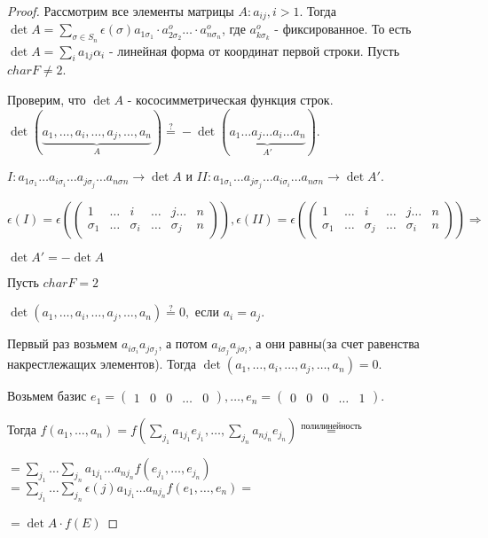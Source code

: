 \begin{proof}
	Рассмотрим все элементы матрицы \(A: a_{ij}, i>1\). Тогда \(\det A = \sum_{\sigma\in S_n} \epsilon(\sigma)a_{1\sigma_1}\cdot a^o_{2\sigma_2}\ldots \cdot a^o_{n\sigma_n}\), где \(a^o_{k\sigma_k}\) - фиксированное. То есть \(\det A = \sum_{i}a_{1j}\alpha_i\) - линейная форма от координат первой строки. \newline
	Пусть \(char F\ne 2\). 
	
	Проверим, что $\det A$ - кососимметрическая функция строк. \newline \(\det(\underbrace{a_1, \ldots, a_i, \ldots, a_j, \ldots, a_n}_A) \overset{?}{=} -\det(\underbrace{a_1 \ldots a_j \ldots a_i \ldots a_n}_{A'}).\) 
	
	\(I:a_{1\sigma_1}\ldots a_{i\sigma_i}\ldots a_{j\sigma_j}\ldots a_{n\sigma n}\to \det A\) и \(II:a_{1\sigma_1}\ldots a_{j\sigma_j}\ldots a_{i\sigma_i}\ldots a_{n\sigma n}\to \det A'.\)
	
	\(\epsilon(I) = \epsilon(\begin{pmatrix}
		1 & \ldots & i & \ldots & j \ldots & n \\
		\sigma_1 & \ldots & \sigma_i &\ldots &\sigma_j & n
	\end{pmatrix}), \epsilon(II) = \epsilon(\begin{pmatrix}
	1 & \ldots & i & \ldots & j \ldots & n \\
	\sigma_1 & \ldots & \sigma_j &\ldots &\sigma_i & n
	\end{pmatrix}) \Longrightarrow\) 
	
	\( \det A' = - \det A\) \newline

	Пусть \(char F=2\) 
	
	\(\det (a_1 , \ldots, a_i, \ldots, a_j, \ldots, a_n)\overset{?}{=} 0, \) если \(a_i = a_j\). 
	
	Первый раз возьмем \(a_{i\sigma_i}a_{j\sigma_j}\), а потом \(a_{i\sigma_j}a_{j\sigma_i}\), а они равны(за счет равенства накрестлежащих элементов). 
	Тогда \(\det (a_1 , \ldots, a_i, \ldots, a_j, \ldots, a_n)= 0\). \newline
	
	Возьмем базис \(e_1 = \begin{pmatrix}
	 1 & 0 & 0 & \ldots & 0
	\end{pmatrix}, \ldots, e_n = \begin{pmatrix}
	0 & 0 & 0 & \ldots & 1
	\end{pmatrix}\). 
	
	Тогда \(f(a_1, \ldots, a_n) = f(\sum_{j_1}a_{1j_1}e_{j_1}, \ldots, \sum_{j_n}a_{nj_n}e_{j_n}) \overset{\text{полилинейность}}{=} \) 
	
	\(= \sum_{j_1}\ldots \sum_{j_n} a_{1j_1}\ldots a_{nj_n}f(e_{j_1}, \ldots, e_{j_n})\)\( = \sum_{j_1}\ldots \sum_{j_n}\epsilon(j) a_{1j_1}\ldots a_{nj_n}f(e_1, \ldots, e_n) = \) 
	
	\(= \det A\cdot f(E) \)
\end{proof}
